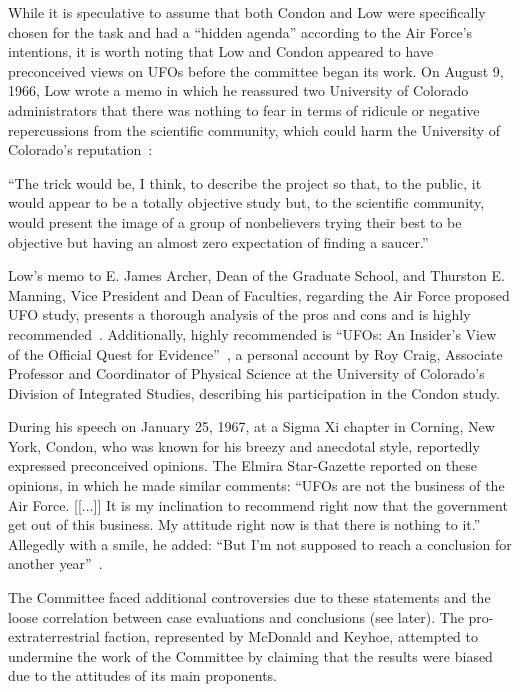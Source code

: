 While it is speculative to assume that both Condon and Low were specifically chosen for the task and had a ``hidden agenda'' according to the Air Force's intentions, it is worth noting that Low and Condon appeared to have preconceived views on UFOs before the committee began its work. On August 9, 1966, Low wrote a memo in which he reassured two University of Colorado administrators that there was nothing to fear in terms of ridicule or negative repercussions from the scientific community, which could harm the University of Colorado's reputation~\cite[pp.~33,34]{Hoyt2000Apr}:
\begin{svgraybox}
``The trick would be, I think, to describe the project so that, to
the public, it would appear to be a totally objective study but, to the scientific community,
would present the image of a group of nonbelievers trying their best to be objective but
having an almost zero expectation of finding a saucer.''
\end{svgraybox}
Low's memo to E. James Archer, Dean of the Graduate School, and Thurston E. Manning, Vice President and Dean of Faculties,
regarding the Air Force proposed UFO study, presents a thorough analysis of the pros and cons and is highly recommended~\cite[pp.~33,34]{Hoyt2000Apr}.
Additionally, highly recommended is ``UFOs: An Insider's View of the Official Quest for Evidence''~\cite{CraigCondon1995},
a personal account by Roy Craig,
Associate Professor and Coordinator of Physical Science
at the University of Colorado's Division of Integrated Studies,
describing his participation in the Condon study.

During his speech on January 25, 1967, at a Sigma Xi chapter in Corning, New York, Condon, who was known for his breezy and anecdotal style, reportedly expressed preconceived opinions. The Elmira Star-Gazette reported on these opinions, in which he made similar comments:
``UFOs are not the business of the Air Force. [[$\ldots$]]
It is my inclination to recommend right now that the government get out of this business.
My attitude right now is that there is nothing to it.'' Allegedly with a smile, he added:
``But I'm not supposed to reach a conclusion for another year''~\cite{Hoyt2000Apr,Fuller1968}.

The Committee faced additional controversies due to these statements and the loose correlation between case evaluations and conclusions (see later).
The pro-extraterrestrial faction, represented by McDonald and Keyhoe, attempted to undermine the work of the Committee by claiming that the results were biased due to the attitudes of its main proponents.

